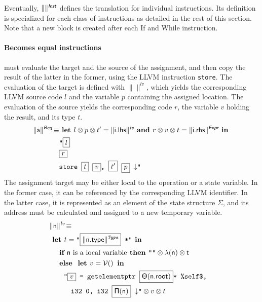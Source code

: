 \documentclass{llncs}
\newcommand{\trad}[2]{\ensuremath{\lVert \textsf{#1} \rVert^{\textit{#2}}}}
\newcommand{\nl}[0]{\ensuremath{\downarrow}}
\DeclareMathOperator{\conc}{\diamond}
\DeclareMathOperator{\isdef}{\equiv}
\DeclareMathOperator{\variable}{\mathcal{V}()}
\newcommand{\llvm}[1]{\texttt{#1}}
\newcommand{\B}[1]{\textsf{#1}}
\newcommand{\IF}[0]{\textbf{ if }}
\newcommand{\ELSE}[0]{\textbf{ else }}
\newcommand{\THEN}[0]{\textbf{ then }}
\newcommand{\LET}[0]{\textbf{ let }}
\newcommand{\IN}[0]{\textbf{ in }}
\newcommand{\AND}[0]{\textbf{ and }}
\newcommand{\PH}[1]{\framebox{$#1$}}
\newcommand{\sep}[0]{\otimes}
\newcommand{\local}[0]{\ensuremath{\sf\lambda}}
\newcommand{\idx}[0]{\ensuremath{\sf\Pi}}
\newcommand{\state}[0]{\ensuremath{\sf\Theta}}
\begin{document}
Eventually, $\trad{}{\B{Inst}}$ defines the translation for individual
instructions. Its definition is specialized for each class of instructions as
detailed in the rest of this section. Note that a new block is created after
each \B{If} and \B{While} instruction.

\paragraph{Becomes equal instructions} must evaluate the target and the source
of the assignment, and then copy the result of the latter in the former, using
the LLVM instruction \llvm{store}. The evaluation of the target is defined with
$\trad{}{lv}$, which yields the corresponding LLVM source code $l$ and the
variable $p$ containing the assigned location. The evaluation of the source
yields the corresponding code $r$, the variable $v$ holding the result, and its
type $t$.
\begin{align*}
\begin{split}
  \trad{a}{\B{Beq}} \isdef 
  & \LET l \sep p \sep t'= \trad{i.lhs}{lv} \AND r \sep v \sep t = \trad{i.rhs}{\B{Expr}} \IN \\
  & \llvm{"\PH{l}} \\
  & \llvm{\PH{r}} \\
  & \llvm{store \PH{t} \PH{v}, \PH{t'} \PH{p} \nl"}
\end{split}
\end{align*}
The assignment target may be either local to the operation or a state
variable. In the former case, it can be referenced by the corresponding LLVM
identifier. In the latter case, it is represented as an element of the state
structure $\Sigma$, and its address must be calculated and assigned to a new temporary
variable.
\begin{align*}
\lefteqn{\trad{n}{lv} \isdef} \\
& \LET t = \llvm{"\PH{\trad{\B{n.type}}{Type}} *"} \IN \\
& \quad \IF \mbox{\B{n} is a local variable} \THEN \llvm{""} \sep \local(\B{n}) \sep t \\
& \quad \ELSE \LET v = \variable \IN \\
& \quad \quad \llvm{"\PH{v} = getelementptr \PH{\state(\B{n.root})}* \%self\$,} \\
& \quad \quad \quad \llvm{i32 0, i32 \PH{\idx(\B{n})} \nl"} \sep v \sep t
\end{align*}
\end{document}
